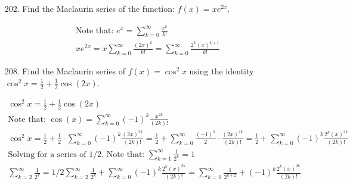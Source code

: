 \begin{itemize}
        \item [202.] Find the Maclaurin series of the function: $f(x) = xe^{2x}$.
        \\
        \begin{mdframed}
            \begin{equation*}
                \begin{gathered}
                    \text{Note that: } e^{x} = 
                    \sum_{k=0}^{\infty}\frac{x^{k}}{k!}                 \\
                    xe^{2x} = x\sum_{k=0}^{\infty}\frac{(2x)^{k}}{k!} =
                    \boxed{\sum_{k=0}^{\infty}\frac{2^{k}(x)^{k+1}}{k!}}
                \end{gathered}
            \end{equation*}
        \end{mdframed}
        
        \item [208.] Find the Maclaurin series of $f(x)=\cos^{2}x$ using the identity $\cos^{2}x=\frac{1}{2}+\frac{1}{2}\cos(2x)$.
        \\
        \begin{mdframed}
            \begin{equation*}
                \begin{gathered}
                    \cos^{2}x=\frac{1}{2}+\frac{1}{2}\cos(2x)           \\
                    \text{Note that: } \cos(x)
                     = \sum_{k=0}^{\infty}(-1)^{k}\frac{x^{2k}}{(2k)!}  \\
                    \cos^{2}x = \frac{1}{2} + \frac{1}{2} \cdot
                    \sum_{k=0}^{\infty}(-1)^{k}\frac{(2x)^{2k}}{(2k)!} =
                    \frac{1}{2} + \sum_{k=0}^{\infty}
                    \frac{(-1)^{k}}{2} \cdot \frac{(2x)^{2k}}{(2k)!} =
                    \frac{1}{2} + \sum_{k=0}^{\infty}
                    (-1)^{k} \frac{2^{k}(x)^{2k}}{(2k)!}                \\
                    \text{Solving for a series of $1/2$, Note that: } 
                    \sum_{k=1}^{\infty}\frac{1}{2^{k}} = 1              \\
                    \sum_{k=2}^{\infty}\frac{1}{2^{k}} = 1/2
                    \sum_{k=2}^{\infty}\frac{1}{2^{k}} + \sum_{k=0}^{\infty}
                    (-1)^{k} \frac{2^{k}(x)^{2k}}{(2k)!} =              
                    \boxed{\sum_{k=0}^{\infty}\frac{1}{2^{k+2}} +
                    (-1)^{k} \frac{2^{k}(x)^{2k}}{(2k)!}}
                \end{gathered}
            \end{equation*}
        \end{mdframed}
    \end{itemize}

